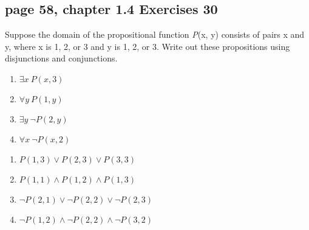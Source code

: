 \documentclass[sigconf]{acmart}
\begin{document}
\subsection{page 58, chapter 1.4 Exercises 30}
\begin{shaded}
    Suppose the domain of the propositional function \textit{P}(x, y) consists of pairs x and y, where x is 1, 2, or 3 and y is 1, 2, or 3. Write out these propositions using disjunctions and conjunctions.
    \begin{enumerate}[label=(\alph*)]
        \item $\exists x ~ P(x,3)$
        \item $\forall y ~ P(1,y)$
        \item $\exists y ~ \neg P(2,y)$
        \item $\forall x ~ \neg P(x,2)$
    \end{enumerate}
\end{shaded} 
\begin{enumerate}[label=(\alph*)]
	\item$ P(1,3) \vee P(2,3) \vee P(3,3) $
	\item \underline{$ P(1,1) \land P(1,2) \land P(1,3) $}
	\item \underline{$ \neg P(2,1) \lor \neg P(2,2) \lor \neg P(2,3) $} 
	\item \underline{$ \neg P(1,2) \land \neg P(2,2) \land \neg P(3,2) $}
\end{enumerate}
\end{document}
